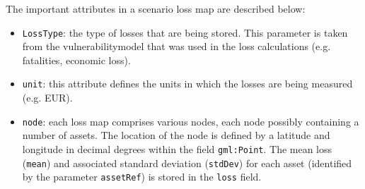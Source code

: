 The important attributes in a scenario loss map are described below:

\begin{itemize}

  \item \Verb+LossType+: the type of losses that are being stored. This
    parameter is taken from the \gls{vulnerabilitymodel} that was used in the
    loss calculations (e.g. fatalities, economic loss).

  \item \Verb+unit+: this attribute defines the units in which the losses are
    being measured (e.g. EUR).

  \item \Verb+node+: each loss map comprises various nodes, each node possibly
    containing a number of \glspl{asset}. The location of the node is defined
    by a latitude and longitude in decimal degrees within the field
    \Verb+gml:Point+. The mean loss (\Verb+mean+) and associated standard
    deviation (\Verb+stdDev+) for each \gls{asset} (identified by the parameter
    \Verb+assetRef+) is stored in the \Verb+loss+ field.

\end{itemize}